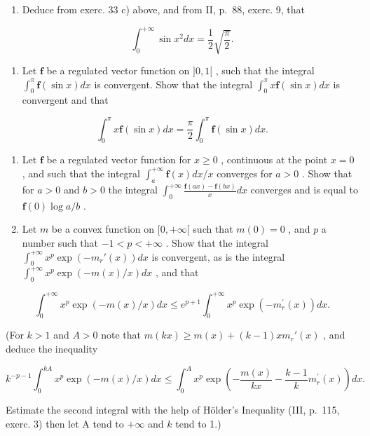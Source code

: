 \begin{enumerate}
\def\labelenumi{\arabic{enumi})}
\setcounter{enumi}{35}
\tightlist
\item
  Deduce from exerc. 33 c) above, and from II, p.~88, exerc. 9, that
\end{enumerate}

\[
\int_ {0} ^ {+ \infty} \sin x ^ {2} d x = \frac {1}{2} \sqrt {\frac {\pi}{2}}.
\]

\begin{enumerate}
\def\labelenumi{\arabic{enumi})}
\setcounter{enumi}{36}
\tightlist
\item
  Let \(\mathbf{f}\) be a regulated vector function on \(]0, 1[\) , such that the integral \(\int_0^\pi \mathbf{f}(\sin x) dx\) is convergent. Show that the integral \(\int_0^\pi x \mathbf{f}(\sin x) dx\) is convergent and that
\end{enumerate}

\[
\int_ {0} ^ {\pi} x \mathbf {f} (\sin x) d x = \frac {\pi}{2} \int_ {0} ^ {\pi} \mathbf {f} (\sin x) d x.
\]

\begin{enumerate}
\def\labelenumi{\arabic{enumi})}
\setcounter{enumi}{37}
\item
  Let \(\mathbf{f}\) be a regulated vector function for \(x \geqslant 0\) , continuous at the point \(x = 0\) , and such that the integral \(\int_{a}^{+\infty} \mathbf{f}(x) dx / x\) converges for \(a > 0\) . Show that for \(a > 0\) and \(b > 0\) the integral \(\int_{0}^{+\infty} \frac{\mathbf{f}(ax) - \mathbf{f}(bx)}{x} dx\) converges and is equal to \(\mathbf{f}(0) \log a / b\) .
\item
  Let \(m\) be a convex function on \([0, +\infty[\) such that \(m(0) = 0\) , and \(p\) a number such that \(-1 < p < +\infty\) . Show that the integral \(\int_0^{+\infty} x^p \exp(-m_r'(x)) dx\) is convergent, as is the integral \(\int_0^{+\infty} x^p \exp(-m(x)/x) dx\) , and that
\end{enumerate}

\[
\int_ {0} ^ {+ \infty} x ^ {p} \exp (- m (x) / x) d x \leqslant e ^ {p + 1} \int_ {0} ^ {+ \infty} x ^ {p} \exp (- m _ {r} ^ {\prime} (x)) d x.
\]

(For \(k > 1\) and \(A > 0\) note that \(m(kx) \geqslant m(x) + (k - 1)x m_r'(x)\) , and deduce the inequality

\[
k ^ {- p - 1} \int_ {0} ^ {k A} x ^ {p} \exp (- m (x) / x) d x \leqslant \int_ {0} ^ {A} x ^ {p} \exp \left(- \frac {m (x)}{k x} - \frac {k - 1}{k} m _ {r} ^ {\prime} (x)\right) d x.
\]

Estimate the second integral with the help of Hölder's Inequality (III, p.~115, exerc. 3) then let A tend to \(+\infty\) and \(k\) tend to 1.)

\setcounter{exercisegroup}{1}
